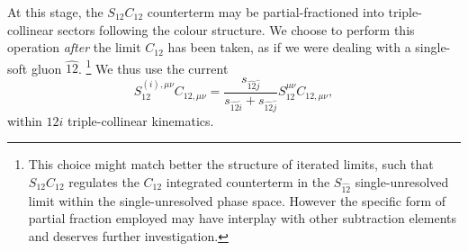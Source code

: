 \documentclass[11pt,a4paper]{article}
\newcommand{\mgd}[1]{\widehat{#1}}
\begin{document}
At this stage, the $S_{12}C_{12}$ counterterm may be partial-fractioned
into triple-collinear sectors following the colour structure.
We choose to perform this operation \emph{after} the limit $C_{12}$
has been taken, as if we were dealing with a single-soft gluon $\mgd{12}$.%
\footnote{
This choice might match better the structure of iterated limits,
such that $S_{12}C_{12}$ regulates the $C_{12}$ integrated counterterm
in the $S_{\mgd{12}}$ single-unresolved limit
within the single-unresolved phase space.
However the specific form of partial fraction employed
may have interplay with other subtraction elements
and deserves further investigation.
}
We thus use the current
\begin{equation}
	S_{12}^{(i),\mu\nu} C_{12,\mu\nu}
	= \frac{s_{\mgd{12}\mgd{j}}}{s_{\mgd{12}\mgd{i}}+s_{\mgd{12}\mgd{j}}}
	S_{12}^{\mu\nu} C_{12,\mu\nu},
\end{equation}
within $12i$ triple-collinear kinematics.
\end{document}
